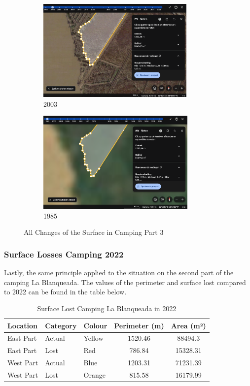 \begin{figure}[H]
    \centering
    \begin{subfigure}[b]{0.48\textwidth}
        \includegraphics[width=\linewidth, height =5cm]{figures/appendix-g/opp2003.png}
        \caption{2003}
        \label{fig:second}
    \end{subfigure}
    \hfill
    \begin{subfigure}[b]{0.48\textwidth}
        \includegraphics[width=\linewidth, height =5cm]{figures/appendix-g/opp1985.png}
        \caption{1985}
        \label{fig:second}
    \end{subfigure}
        \caption{All Changes of the Surface in Camping Part 3}
    \label{fig:All Changes of the Surface in Camping Part 3}
\end{figure} 

\subsubsection{Surface Losses Camping 2022}
Lastly, the same principle applied to the situation on the second part of the camping La Blanqueada. The values of the perimeter and surface lost compared to  2022 can be found in the table below. 

\begin{table}[h]
\centering
\caption{Surface Lost Camping La Blanqueada in 2022}
\label{tab:Surface Lost Camping La Blanqueada in 2022}
\begin{tabular}{l l l S[table-format=5.2] S[table-format=5.2]}
\toprule
\textbf{Location} & \textbf{Category} & \textbf{Colour} & \textbf{Perimeter (m)} & \textbf{Area (m²)} \\
\midrule
East Part & Actual & Yellow & 1520.46 & 88494.3 \\
East Part & Lost & Red & 786.84 & 15328.31 \\
West Part & Actual & Blue & 1203.31 & 71231.39 \\
West Part & Lost & Orange & 815.58 & 16179.99 \\
\bottomrule
\end{tabular}
\end{table}


